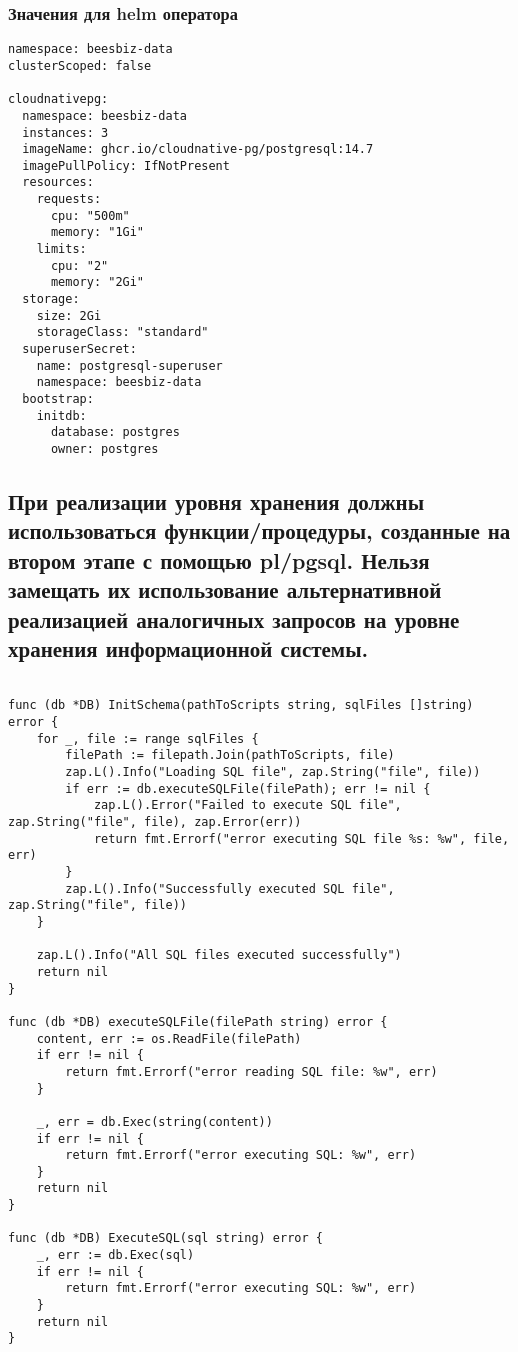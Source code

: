 \documentclass{article}
\begin{document}
\subsubsection{Значения для helm оператора}
\begin{lstlisting}
namespace: beesbiz-data
clusterScoped: false

cloudnativepg:
  namespace: beesbiz-data
  instances: 3
  imageName: ghcr.io/cloudnative-pg/postgresql:14.7
  imagePullPolicy: IfNotPresent
  resources:
    requests:
      cpu: "500m"
      memory: "1Gi"
    limits:
      cpu: "2"
      memory: "2Gi"
  storage:
    size: 2Gi
    storageClass: "standard"
  superuserSecret:
    name: postgresql-superuser
    namespace: beesbiz-data
  bootstrap:
    initdb:
      database: postgres
      owner: postgres
\end{lstlisting}

\subsection{При реализации уровня хранения должны использоваться функции/процедуры, созданные на втором этапе с помощью pl/pgsql. Нельзя замещать их использование альтернативной реализацией аналогичных запросов на уровне хранения информационной системы.
}

\begin{lstlisting}

func (db *DB) InitSchema(pathToScripts string, sqlFiles []string) error {
	for _, file := range sqlFiles {
		filePath := filepath.Join(pathToScripts, file)
		zap.L().Info("Loading SQL file", zap.String("file", file))
		if err := db.executeSQLFile(filePath); err != nil {
			zap.L().Error("Failed to execute SQL file", zap.String("file", file), zap.Error(err))
			return fmt.Errorf("error executing SQL file %s: %w", file, err)
		}
		zap.L().Info("Successfully executed SQL file", zap.String("file", file))
	}

	zap.L().Info("All SQL files executed successfully")
	return nil
}

func (db *DB) executeSQLFile(filePath string) error {
	content, err := os.ReadFile(filePath)
	if err != nil {
		return fmt.Errorf("error reading SQL file: %w", err)
	}

	_, err = db.Exec(string(content))
	if err != nil {
		return fmt.Errorf("error executing SQL: %w", err)
	}
	return nil
}

func (db *DB) ExecuteSQL(sql string) error {
	_, err := db.Exec(sql)
	if err != nil {
		return fmt.Errorf("error executing SQL: %w", err)
	}
	return nil
}
\end{lstlisting}
\end{document}
